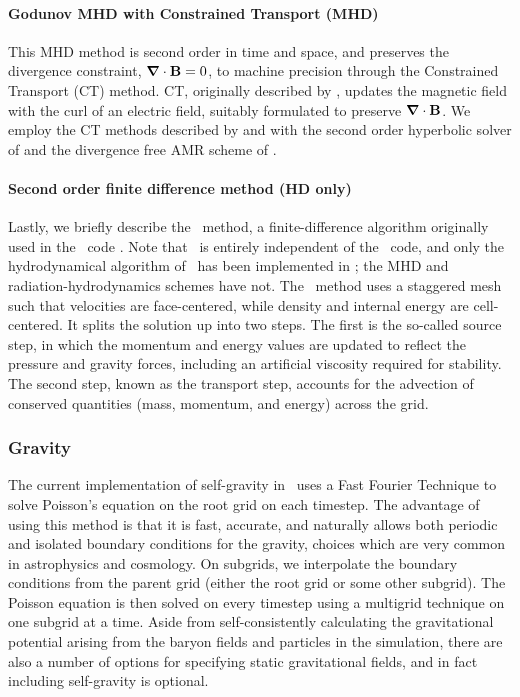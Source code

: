 \paragraph{Godunov MHD with Constrained Transport (MHD)}
This MHD method is second order in time and space, and preserves the
divergence constraint, $\bm{\nabla} \cdot \mathbf{B} = 0$, to machine precision
through the Constrained Transport (CT) method.  CT, originally
described by \citet{Evans88}, updates the magnetic field with the curl
of an electric field, suitably formulated to preserve $\bm{\nabla} \cdot
\mathbf{B}$.  We employ the CT methods described by \citet{Balsara99} and
\citet{Gardiner05} with the second order hyperbolic
solver of \citet{Li08a} and the divergence free AMR scheme of
\citet{Balsara01}.

\paragraph{Second order finite difference method (HD only)}

Lastly, we briefly describe the \zeus\ method, a finite-difference
algorithm originally used in the \zeus\ code \citep{Stone92a}. Note
that \enzo\ is entirely independent of the \zeus\ code, and only the
hydrodynamical algorithm of \zeus\ has been implemented in \enzo; the
MHD and radiation-hydrodynamics schemes have not. The \zeus\ method
uses a staggered mesh such that velocities are face-centered, while
density and internal energy are cell-centered.  It splits the solution
up into two steps. The first is the so-called source step, in which
the momentum and energy values are updated to reflect the pressure and
gravity forces, including an artificial viscosity required for
stability. The second step, known as the transport step, accounts for
the advection of conserved quantities (mass, momentum, and energy)
across the grid.

\subsubsection{Gravity}

The current implementation of self-gravity in \enzo\ uses a Fast
Fourier Technique \citep{Hockney88} to solve Poisson's equation on the
root grid on each timestep.  The advantage of using this method is
that it is fast, accurate, and naturally allows both periodic and
isolated boundary conditions for the gravity, choices which are very
common in astrophysics and cosmology.  On subgrids, we interpolate the
boundary conditions from the parent grid (either the root grid or some
other subgrid). The Poisson equation is then solved on every timestep
using a multigrid technique on one subgrid at a time. Aside from
self-consistently calculating the gravitational potential arising from
the baryon fields and particles in the simulation, there are also a
number of options for specifying static gravitational fields, and in
fact including self-gravity is optional.

